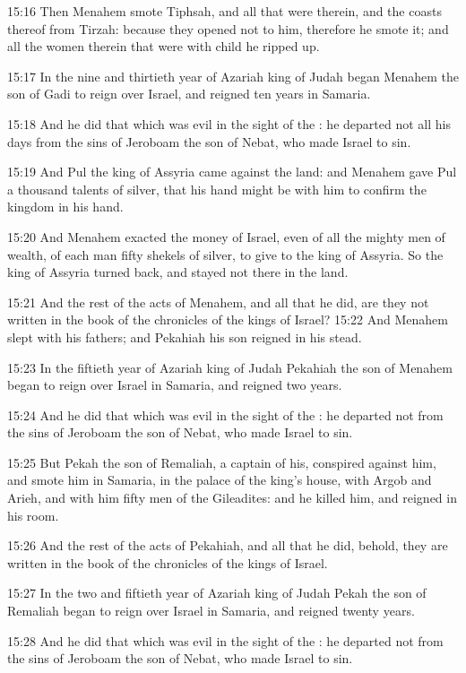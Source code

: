15:16 Then Menahem smote Tiphsah, and all that were therein, and the
coasts thereof from Tirzah: because they opened not to him, therefore
he smote it; and all the women therein that were with child he ripped
up.

15:17 In the nine and thirtieth year of Azariah king of Judah began
Menahem the son of Gadi to reign over Israel, and reigned ten years in
Samaria.

15:18 And he did that which was evil in the sight of the \LORD: he
departed not all his days from the sins of Jeroboam the son of Nebat,
who made Israel to sin.

15:19 And Pul the king of Assyria came against the land: and Menahem
gave Pul a thousand talents of silver, that his hand might be with him
to confirm the kingdom in his hand.

15:20 And Menahem exacted the money of Israel, even of all the mighty
men of wealth, of each man fifty shekels of silver, to give to the
king of Assyria. So the king of Assyria turned back, and stayed not
there in the land.

15:21 And the rest of the acts of Menahem, and all that he did, are
they not written in the book of the chronicles of the kings of Israel?
15:22 And Menahem slept with his fathers; and Pekahiah his son reigned
in his stead.

15:23 In the fiftieth year of Azariah king of Judah Pekahiah the son
of Menahem began to reign over Israel in Samaria, and reigned two
years.

15:24 And he did that which was evil in the sight of the \LORD: he
departed not from the sins of Jeroboam the son of Nebat, who made
Israel to sin.

15:25 But Pekah the son of Remaliah, a captain of his, conspired
against him, and smote him in Samaria, in the palace of the king's
house, with Argob and Arieh, and with him fifty men of the Gileadites:
and he killed him, and reigned in his room.

15:26 And the rest of the acts of Pekahiah, and all that he did,
behold, they are written in the book of the chronicles of the kings of
Israel.

15:27 In the two and fiftieth year of Azariah king of Judah Pekah the
son of Remaliah began to reign over Israel in Samaria, and reigned
twenty years.

15:28 And he did that which was evil in the sight of the \LORD: he
departed not from the sins of Jeroboam the son of Nebat, who made
Israel to sin.

